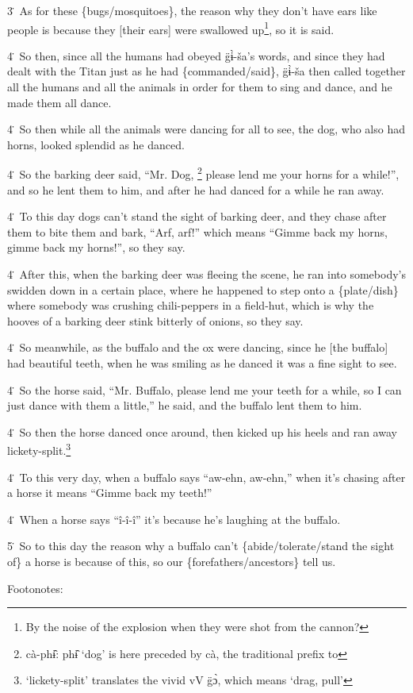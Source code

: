 3\. As for these \{bugs/mosquitoes\}, the reason why they don't have ears like
people is because they [their ears] were swallowed up\footnote{By the noise of the explosion when they were shot from the cannon?}, so it is said.

4\. So then, since all the humans had obeyed g̈ɨ̀-ša's words, and since they
had dealt with the Titan just as he had \{commanded/said\}, g̈ɨ̀-ša then called
together all the humans and all the animals in order for them to sing and dance,
and he made them all dance.

4\. So then while all the animals were dancing for all to see, the dog, who also
had horns, looked splendid as he danced.

4\. So the barking deer said, ``Mr. Dog, \footnote{cà-phɨ̂: phɨ̂ `dog' is here preceded by cà, the traditional prefix to} please lend me your horns for a while!'',
and so he lent them to him, and after he had danced for a while he ran away.

4\. To this day dogs can't stand the sight of barking deer, and they chase after
them to bite them and bark, ``Arf, arf!'' which means ``Gimme back my horns, gimme
back my horns!'', so they say.

4\. After this, when the barking deer was fleeing the scene, he ran into somebody's
swidden down in a certain place, where he happened to step onto a \{plate/dish\}
where somebody was crushing chili-peppers in a field-hut, which is why the hooves
of a barking deer stink bitterly of onions, so they say.

4\. So meanwhile, as the buffalo and the ox were dancing, since he [the buffalo]
had beautiful teeth, when he was smiling as he danced it was a fine sight to see.

4\. So the horse said, ``Mr. Buffalo, please lend me your teeth for a while, so
I can just dance with them a little,'' he said, and the buffalo lent them to him.

4\. So then the horse danced once around, then kicked up his heels and ran away
lickety-split.\footnote{`lickety-split' translates the vivid vV g̈ɔ̀, which means `drag, pull'}

4\. To this very day, when a buffalo says ``aw-ehn, aw-ehn,'' when it's chasing
after a horse it means ``Gimme back my teeth!''

4\. When a horse says ``î-î-î'' it's because he's laughing at the buffalo.

5\. So to this day the reason why a buffalo can't \{abide/tolerate/stand the sight
of\} a horse is because of this, so our \{forefathers/ancestors\} tell us.

Footonotes:

